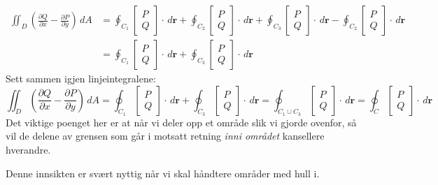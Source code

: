 \begin{align*}
\iint_D \left( \frac{\partial Q}{\partial x} - \frac{\partial P}{\partial y} \right)\, dA
&= \oint_{C_1}\begin{bmatrix} P\\ Q\end{bmatrix} \cdot \, d\mathbf{r}
+ \oint_{C_2} \begin{bmatrix} P\\ Q\end{bmatrix} \cdot \, d\mathbf{r}
+ \oint_{C_3} \begin{bmatrix} P\\ Q\end{bmatrix} \cdot \, d\mathbf{r}
- \oint_{C_2}\begin{bmatrix} P\\ Q\end{bmatrix} \cdot \, d\mathbf{r} \\
&= \oint_{C_1} \begin{bmatrix} P\\ Q\end{bmatrix} \cdot \, d\mathbf{r} + \oint_{C_3}\begin{bmatrix} P\\ Q\end{bmatrix} \cdot \, d\mathbf{r}
\end{align*}
Sett sammen igjen linjeintegralene:
\[
\iint_D \left( \frac{\partial Q}{\partial x} - \frac{\partial P}{\partial y} \right)\, dA
= \oint_{C_1} \begin{bmatrix} P\\ Q\end{bmatrix} \cdot \, d\mathbf{r} + \oint_{C_3} \begin{bmatrix} P\\ Q\end{bmatrix} \cdot \, d\mathbf{r}
= \oint_{C_1 \cup C_3} \begin{bmatrix} P\\ Q\end{bmatrix} \cdot \, d\mathbf{r} = \oint_C \begin{bmatrix} P\\ Q\end{bmatrix} \cdot \, d\mathbf{r}
\]
Det viktige poenget her er at når vi deler opp et område slik vi gjorde ovenfor, så vil de delene av grensen som går i motsatt retning \emph{inni området} kansellere hverandre.

Denne innsikten er svært nyttig når vi skal håndtere områder med hull i.

